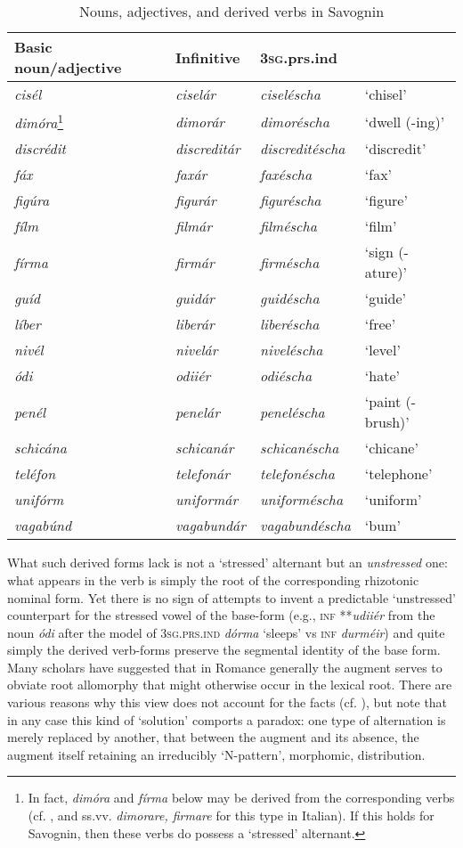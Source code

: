 \documentclass[output=paper,
modfonts
]{LSP/langsci}
\begin{document}
\begin{longtable}[]{@{}lllll@{}}
\caption{Nouns, adjectives, and derived verbs in Savognin} \\
\lsptoprule
Basic noun/adjective & & Infinitive & \textsc{3sg}.prs.ind
&\tabularnewline
\midrule
\endhead
\emph{cisél} & & \emph{ciselár} & \emph{ciseléscha} &
`chisel'\tabularnewline
\emph{dimóra}\footnote{In fact, \emph{dimóra} and \emph{fírma} below may
  be derived from the corresponding verbs (cf. \citealt[517]{thornton2004a}, and
  \citealt{cortelazzo1988} ss.vv. \emph{dimorare, firmare} for
  this type in Italian). If this holds for Savognin, then these verbs do
  possess a `stressed' alternant.}
 & & \emph{dimorár} &
\emph{dimoréscha} & `dwell (-ing)'\tabularnewline
\emph{discrédit} & & \emph{discreditár} & \emph{discreditéscha} &
`discredit'\tabularnewline
\emph{fáx} & & \emph{faxár} & \emph{faxéscha} & `fax'\tabularnewline
\emph{figúra} & & \emph{figurár} & \emph{figuréscha} &
`figure'\tabularnewline
\emph{fílm} & & \emph{filmár} & \emph{filméscha} & `film'\tabularnewline
\emph{fírma} & & \emph{firmár} & \emph{firméscha} & `sign
(-ature)'\tabularnewline
\emph{guíd} & & \emph{guidár} & \emph{guidéscha} &
`guide'\tabularnewline
\emph{líber} & & \emph{liberár} & \emph{liberéscha} &
`free'\tabularnewline
\emph{nivél} & & \emph{nivelár} & \emph{niveléscha} &
`level'\tabularnewline
\emph{ódi} & & \emph{odiiér} & \emph{odiéscha} & `hate'\tabularnewline
\emph{penél} & & \emph{penelár} & \emph{peneléscha} & `paint
(-brush)'\tabularnewline
\emph{schicána} & & \emph{schicanár} & \emph{schicanéscha} &
`chicane'\tabularnewline
\emph{teléfon} & & \emph{telefonár} & \emph{telefonéscha} &
`telephone'\tabularnewline
\emph{unifórm} & & \emph{uniformár} & \emph{uniforméscha} &
`uniform'\tabularnewline
\emph{vagabúnd} & & \emph{vagabundár} & \emph{vagabundéscha} &
`bum'\tabularnewline
\bottomrule
\end{longtable}

What such derived forms lack is not a `stressed' alternant but an
\emph{unstressed} one: what appears in the verb is simply the root of
the corresponding rhizotonic nominal form. Yet there is no sign of
attempts to invent a predictable `unstressed' counterpart for the
stressed vowel of the base-form (e.g., \textsc{inf} **\emph{udiiér} from
the noun \emph{ódi} after the model of \textsc{3sg.prs.ind} \emph{dórma}
`sleeps' vs \textsc{inf} \emph{durméir}) and quite simply the derived
verb-forms preserve the segmental identity of the base form. Many
scholars have suggested that in Romance generally the augment serves to
obviate root allomorphy that might otherwise occur in the lexical root.
There are various reasons why this view does not account for the facts
(cf. \citealt[251f.]{maiden2011c}), but note that in any case this kind of
`solution' comports a paradox: one type of alternation is merely
replaced by another, that between the augment and its absence, the
augment itself retaining an irreducibly `N-pattern', morphomic,
distribution.
\end{document}
